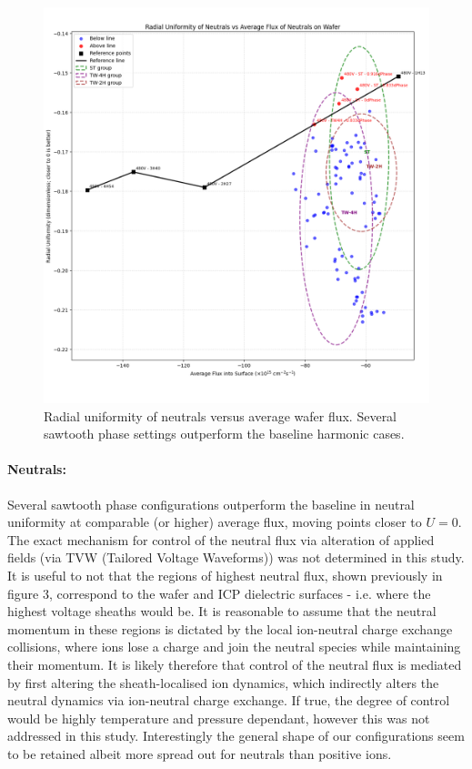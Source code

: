 \documentclass[12pt]{article}
\begin{document}
\begin{figure}[H]
  \centering
  \includegraphics[width=\linewidth]{Figures/Uniformity vs Avg Flux - 0-5.2cm - Neutrals.png}
  \caption{Radial uniformity of neutrals versus average wafer flux. Several sawtooth phase settings outperform the baseline harmonic cases.}
  \label{fig:neut_u}
\end{figure}

\paragraph{Neutrals:}
 Several sawtooth phase configurations outperform the baseline in neutral uniformity at comparable (or higher) average flux, moving points closer to $U\!=\!0$. The exact mechanism for control of the neutral flux via alteration of applied fields (via TVW (Tailored Voltage Waveforms)) was not determined in this study. It is useful to not that the regions of highest neutral flux, shown previously in figure 3, correspond to the wafer and ICP dielectric surfaces - i.e. where the highest voltage sheaths would be. It is reasonable to assume that the neutral momentum in these regions is dictated by the local ion-neutral charge exchange collisions, where ions lose a charge and join the neutral species while maintaining their momentum. It is likely therefore that control of the neutral flux is mediated by first altering the sheath-localised ion dynamics, which indirectly alters the neutral dynamics via ion-neutral charge exchange. If true, the degree of control would be highly temperature and pressure dependant, however this was not addressed in this study. Interestingly the general shape of our configurations seem to be retained albeit more spread out for neutrals than positive ions.
\end{document}
